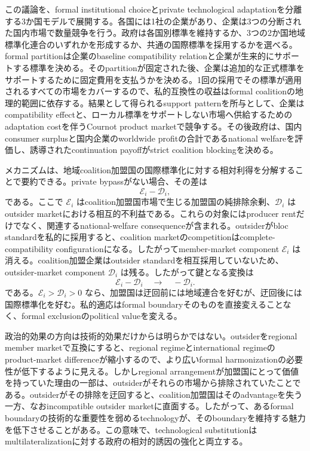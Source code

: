この議論を、formal institutional choiceとprivate technological adaptationを分離する3か国モデルで展開する。各国には1社の企業があり、企業は3つの分断された国内市場で数量競争を行う。政府は各国別標準を維持するか、3つの2か国地域標準化連合のいずれかを形成するか、共通の国際標準を採用するかを選べる。formal partitionは企業のbaseline compatibility relationと企業が生来的にサポートする標準を決める。そのpartitionが固定された後、企業は追加的な正式標準をサポートするために固定費用を支払うかを決める。1回の採用でその標準が適用されるすべての市場をカバーするので、私的互換性の収益はformal coalitionの地理的範囲に依存する。結果として得られるsupport patternを所与として、企業はcompatibility effectと、ローカル標準をサポートしない市場へ供給するためのadaptation costを伴うCournot product marketで競争する。その後政府は、国内consumer surplusと国内企業のworldwide profitの合計であるnational welfareを評価し、誘導されたcontinuation payoffがstrict coalition blockingを決める。

メカニズムは、地域coalition加盟国の国際標準化に対する相対利得を分解することで要約できる。private bypassがない場合、その差は
\begin{equation}
    \mathscr E_i-\mathscr D_i,
    \label{eq:introduction-selective-erosion}
\end{equation}
である。ここで $\mathscr E_i$ はcoalition加盟国市場で生じる加盟国の純排除余剰、$\mathscr D_i$ はoutsider marketにおける相互的不利益である。これらの対象にはproducer rentだけでなく、関連するnational-welfare consequenceが含まれる。outsiderがbloc standardを私的に採用すると、coalition marketのcompetitionはcomplete-compatibility configurationになる。したがってmember-market component $\mathscr E_i$ は消える。coalition加盟企業はoutsider standardを相互採用していないため、outsider-market component $\mathscr D_i$ は残る。したがって鍵となる変換は
\[
    \mathscr E_i-\mathscr D_i
    \quad\longrightarrow\quad
    -\mathscr D_i.
\]
である。$\mathscr E_i>\mathscr D_i>0$ なら、加盟国は迂回前には地域連合を好むが、迂回後には国際標準化を好む。私的適応はformal boundaryそのものを直接変えることなく、formal exclusionのpolitical valueを変える。

政治的効果の方向は技術的効果だけからは明らかではない。outsiderをregional member marketで互換にすると、regional regimeとinternational regimeのproduct-market differenceが縮小するので、より広いformal harmonizationの必要性が低下するように見える。しかしregional arrangementが加盟国にとって価値を持っていた理由の一部は、outsiderがそれらの市場から排除されていたことである。outsiderがその排除を迂回すると、coalition加盟国はそのadvantageを失う一方、なおincompatible outsider marketに直面する。したがって、あるformal boundaryの技術的な重要性を弱めるtechnologyが、そのboundaryを維持する魅力を低下させることがある。この意味で、technological substitutionはmultilateralizationに対する政府の相対的誘因の強化と両立する。

